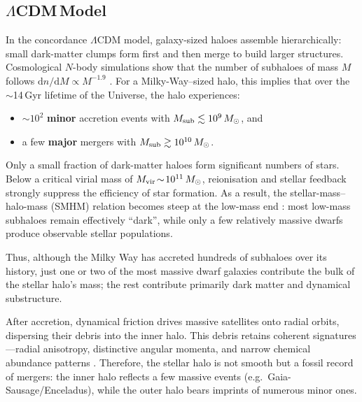 \documentclass[a4paper,12pt]{article}
\begin{document}
\subsection{\texorpdfstring{$\Lambda$CDM\,Model}{LambdaCDM Model}}


\label{subsec:LCDM_halo}

In the concordance $\Lambda$CDM model, galaxy-sized haloes assemble hierarchically:  
small dark-matter clumps form first and then merge to build larger structures.  
Cosmological $N$-body simulations show that the number of subhaloes of mass $M$ follows  
$\mathrm{d}n/\mathrm{d}M \propto M^{-1.9}$ \citep{Springel2008}.  
For a Milky-Way–sized halo, this implies that over the $\sim$14\,Gyr lifetime of the Universe, the halo experiences:
\begin{itemize}
    \item ${\sim}10^{2}$ \textbf{minor} accretion events with $M_{\rm sub}\lesssim10^{9}\,M_\odot$, and 
    \item a few \textbf{major} mergers with $M_{\rm sub}\gtrsim10^{10}\,M_\odot$.
\end{itemize}
  

Only a small fraction of dark-matter haloes form significant numbers of stars.  
Below a critical virial mass of $M_{\rm vir}\!\sim\!10^{11}\,M_\odot$, reionisation and stellar feedback 
strongly suppress the efficiency of star formation.  
As a result, the stellar-mass–halo-mass (SMHM) relation becomes steep at the low-mass end 
\citep{Purcell2007,BullockBoylanKolchin2017}:  
most low-mass subhaloes remain effectively ``dark'', while only a few relatively massive dwarfs 
produce observable stellar populations.

Thus, although the Milky Way has accreted hundreds of subhaloes over its history,  
just one or two of the most massive dwarf galaxies contribute the bulk of the stellar halo’s mass;  
the rest contribute primarily dark matter and dynamical substructure.

After accretion, dynamical friction drives massive satellites onto radial orbits, dispersing 
their debris into the inner halo. This debris retains coherent signatures—radial anisotropy,
distinctive angular momenta, and narrow chemical abundance patterns \citep[e.g.][]{HelmiDeZeeuw2000}. 
Therefore, the stellar halo is not smooth but a fossil record of mergers: the inner halo reflects a 
few massive events (e.g.\ Gaia-Sausage/Enceladus), while the outer halo bears imprints of numerous 
minor ones.
\end{document}
